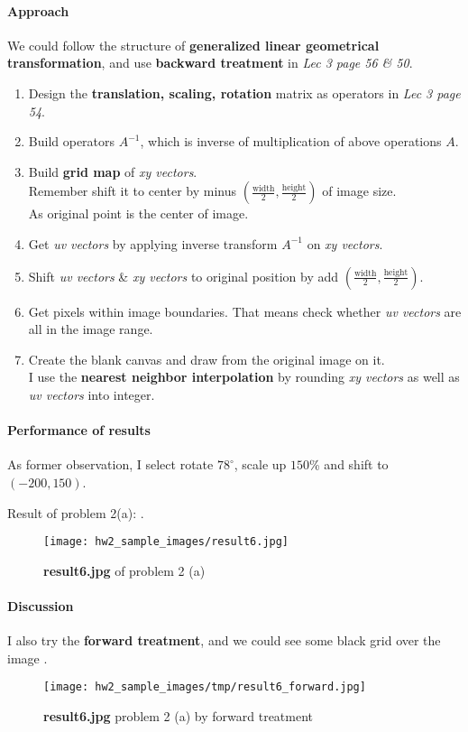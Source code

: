 \paragraph{Approach}
We could follow the structure of \textbf{generalized linear geometrical transformation}, and use \textbf{backward treatment} in \textit{Lec 3 page 56 \& 50}.
\begin{enumerate}
    \item Design the \textbf{translation, scaling, rotation} matrix as operators in \textit{Lec 3 page 54}.
    \item Build operators $A^{-1}$, which is inverse of multiplication of above operations $A$.
    \item Build \textbf{grid map} of \textit{xy vectors}. \\
    Remember shift it to center by minus $(\frac{\mbox{width}}{2}, \frac{\mbox{height}}{2})$ of image size. \\
    As original point is the center of image.
    \item Get \textit{uv vectors} by applying inverse transform $A^{-1}$ on \textit{xy vectors}.
    \item Shift \textit{uv vectors} \& \textit{xy vectors} to original position by add $(\frac{\mbox{width}}{2}, \frac{\mbox{height}}{2})$.
    \item Get pixels within image boundaries. That means check whether \textit{uv vectors} are all in the image range.
    \item Create the blank canvas and draw from the original image on it. \\
    I use the \textbf{nearest neighbor interpolation} by rounding \textit{xy vectors} as well as \textit{uv vectors} into integer.
\end{enumerate}

\paragraph{Performance of results}
As former observation, I select rotate $78^{\circ}$, scale up $150$\% and
shift to $(-200, 150)$.

Result of problem 2(a): .
\begin{figure}
    \centering
    \texttt{[image: hw2\_sample\_images/result6.jpg]}
    \caption{\textbf{result6.jpg} of problem 2 (a)}
    \label{result6}
\end{figure}

\paragraph{Discussion}
I also try the \textbf{forward treatment}, and we could see some \alert{black grid} over the image .
\begin{figure}
    \centering
    \texttt{[image: hw2\_sample\_images/tmp/result6\_forward.jpg]}
    \caption{\textbf{result6.jpg} problem 2 (a) by forward treatment}
    \label{result6_forward}
\end{figure}


